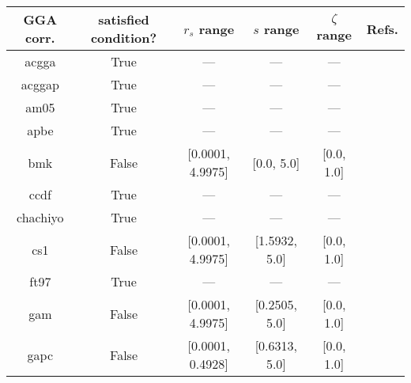 \begin{tabular}{|c|c|c|c|c|l|}
\hline
     GGA corr. &  satisfied condition? &      $r_s$ range &        $s$ range &   $\zeta$ range  &                                                          Refs. \\ \hline
         acgga &                  True &              --- &              --- &              --- &                        \cite{Cancio2018_084116,Burke2014_4834} \\ \hline
        acggap &                  True &              --- &              --- &              --- &                        \cite{Cancio2018_084116,Burke2014_4834} \\ \hline
          am05 &                  True &              --- &              --- &              --- &                 \cite{Armiento2005_085108,Mattsson2008_084714} \\ \hline
          apbe &                  True &              --- &              --- &              --- &                                   \cite{Constantin2011_186406} \\ \hline
           bmk &                 False & [0.0001, 4.9975] &       [0.0, 5.0] &       [0.0, 1.0] &                                          \cite{Boese2004_3405} \\ \hline
          ccdf &                  True &              --- &              --- &              --- &                                      \cite{Margraf2019_244116} \\ \hline
      chachiyo &                  True &              --- &              --- &              --- &                                     \cite{Chachiyo2020_112669} \\ \hline
           cs1 &                 False & [0.0001, 4.9975] &    [1.5932, 5.0] &       [0.0, 1.0] &                          \cite{Handy2002_5411,Proynov2006_436} \\ \hline
          ft97 &                  True &              --- &              --- &              --- &                         \cite{Filatov1997_603,Filatov1997_847} \\ \hline
           gam &                 False & [0.0001, 4.9975] &    [0.2505, 5.0] &       [0.0, 1.0] &                                            \cite{Yu2015_12146} \\ \hline
          gapc &                 False & [0.0001, 0.4928] &    [0.6313, 5.0] &       [0.0, 1.0] &                                        \cite{Fabiano2014_2016} \\ \hline

\end{tabular}
